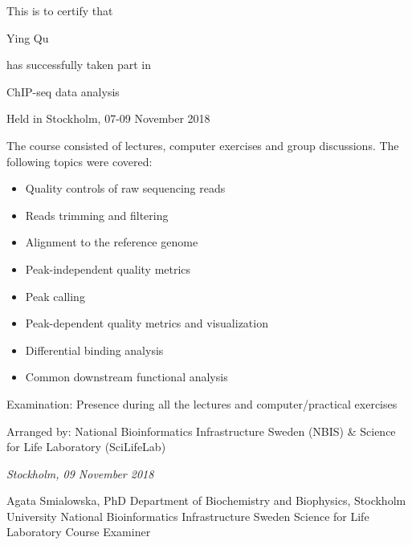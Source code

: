 \documentclass[12pt]{article}\usepackage[]{graphicx}\usepackage[]{color}
\newcommand{\courseName}{ChIP-seq data analysis}
\newcommand{\coursePoints}{1 hp}
\newcommand{\courseLocation}{Stockholm}
\newcommand{\courseDate}{07-09 November 2018}
\newcommand{\courseLastDay}{09 November 2018}
\newcommand{\courseExaminer}{Agata Smialowska, PhD}
\begin{document}
\large
This is to certify that 


\LARGE
\color{blue} 
Ying Qu
\color{black} 

\large
has successfully taken part in \newline \newline

\color{blue} 
\LARGE
\begin{center}{\courseName}  \end{center} 
\color{black} 

\large
\begin{center} Held in {\courseLocation}, {\courseDate} \end{center} 

\vspace{8mm}
\normalsize
The course consisted of lectures, computer exercises and group discussions. The following topics were covered:
\begin{itemize}
  \item Quality controls of raw sequencing reads
  \item Reads trimming and filtering
  \item Alignment to the reference genome
  \item Peak-independent quality metrics
  \item Peak calling
  \item Peak-dependent quality metrics and visualization
  \item Differential binding analysis
  \item Common downstream functional analysis
\end{itemize}


\vspace{5mm}
Examination: \newline
Presence during all the lectures and computer/practical exercises

\vspace{5mm}
Arranged by: \newline
National Bioinformatics Infrastructure Sweden (NBIS) \& Science for Life Laboratory (SciLifeLab)


\vspace{5mm}
\textit{{\courseLocation}, {\courseLastDay}}
\vspace{15mm}


{\courseExaminer} \newline
\small
Department of Biochemistry and Biophysics, Stockholm University \newline
National Bioinformatics Infrastructure Sweden \newline
Science for Life Laboratory \newline
Course Examiner



\end{document}

